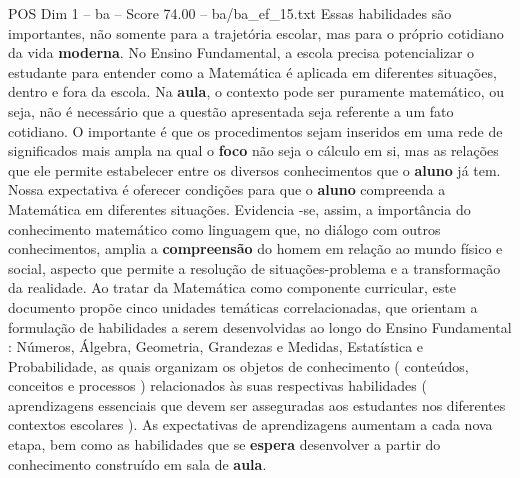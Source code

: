 \begin{textsample}{POS Dim 1 – ba – Score 74.00 – ba/ba\_ef\_15.txt}
Essas habilidades são importantes, não somente para a trajetória escolar, mas para o próprio cotidiano da vida \textbf{moderna}.
No Ensino Fundamental, a escola precisa potencializar o estudante para entender como a Matemática é aplicada em diferentes situações, dentro e fora da escola.
Na \textbf{aula}, o contexto pode ser puramente matemático, ou seja, não é necessário que a questão apresentada seja referente a um fato cotidiano.
O importante é que os procedimentos sejam inseridos em uma rede de significados mais ampla na qual o \textbf{foco} não seja o cálculo em si, mas as relações que ele permite estabelecer entre os diversos conhecimentos que o \textbf{aluno} já tem.
Nossa expectativa é oferecer condições para que o \textbf{aluno} compreenda a Matemática em diferentes situações.
Evidencia -se, assim, a importância do conhecimento matemático como linguagem que, no diálogo com outros conhecimentos, amplia a \textbf{compreensão} do homem em relação ao mundo físico e social, aspecto que permite a resolução de situações-problema e a transformação da realidade.
Ao tratar da Matemática como componente curricular, este documento propõe cinco unidades temáticas correlacionadas, que orientam a formulação de habilidades a serem desenvolvidas ao longo do Ensino Fundamental : Números, Álgebra, Geometria, Grandezas e Medidas, Estatística e Probabilidade, as quais organizam os objetos de conhecimento ( conteúdos, conceitos e processos ) relacionados às suas respectivas habilidades ( aprendizagens essenciais que devem ser asseguradas aos estudantes nos diferentes contextos escolares ).
As expectativas de aprendizagens aumentam a cada nova etapa, bem como as habilidades que se \textbf{espera} desenvolver a partir do conhecimento construído em sala de \textbf{aula}.

\end{textsample}
